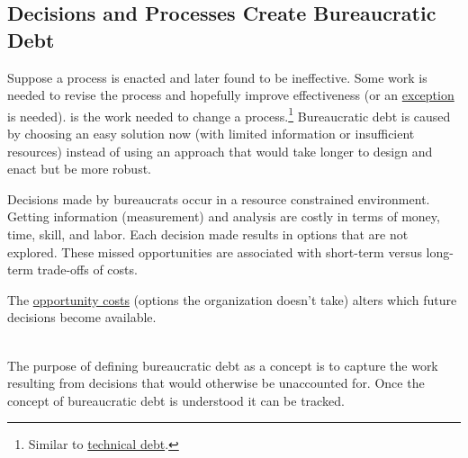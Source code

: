 \subsection*{Decisions and Processes Create Bureaucratic Debt\label{sec:bureaucratic-debt}}


Suppose a \gls{process} is enacted and later found to be ineffective. Some work is needed to revise the process and hopefully improve effectiveness (or an \hyperref[sec:exceptions-to-process]{exception} is needed).
\iftoggle{glossarysubstitutionworks}{\Gls{bureaucratic debt}}{Bureaucratic debt} is 
\iftoggle{glossaryinmargin}{\marginpar{[Glossary]}}{}  the work needed to change a process.\footnote{Similar to \href{https://en.wikipedia.org/wiki/Technical_debt}{technical debt}\iftoggle{boundbook}{; see Wikipedia entry}{}.
}
Bureaucratic debt is caused by choosing an easy solution now (with limited information or insufficient resources) instead of using an approach that would take longer to design and enact but be more robust.


Decisions made by \glspl{bureaucrat} occur in a resource constrained environment.
Getting information (measurement) and analysis are costly in terms of money, time, skill, and labor.
Each decision made results in options that are not explored. These missed opportunities are associated with short-term versus long-term trade-offs of costs.

The \href{https://en.wikipedia.org/wiki/Opportunity_cost}{opportunity costs}
(options the organization doesn't take) alters which future decisions become available.

\ \\

The purpose of defining bureaucratic debt as a concept is to capture the work resulting from decisions that would otherwise be unaccounted for.
Once the concept of bureaucratic debt is understood it can be tracked.

